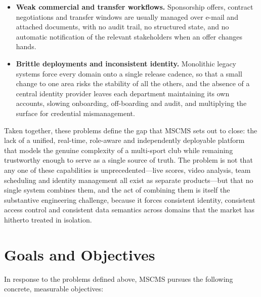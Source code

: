 \begin{itemize}
        incidence per position, or the contribution of a particular scout---is impractical,
        because the data needed to correlate one domain with another never sits in the same
        place.
  \item \textbf{Weak commercial and transfer workflows.} Sponsorship offers, contract
        negotiations and transfer windows are usually managed over e-mail and attached
        documents, with no audit trail, no structured state, and no automatic notification
        of the relevant stakeholders when an offer changes hands.
  \item \textbf{Brittle deployments and inconsistent identity.} Monolithic legacy systems
        force every domain onto a single release cadence, so that a small change to one area
        risks the stability of all the others, and the absence of a central identity provider
        leaves each department maintaining its own accounts, slowing onboarding,
        off-boarding and audit, and multiplying the surface for credential mismanagement.
\end{itemize}

Taken together, these problems define the gap that MSCMS sets out to close: the lack of a
unified, real-time, role-aware and independently deployable platform that models the genuine
complexity of a multi-sport club while remaining trustworthy enough to serve as a single
source of truth. The problem is not that any one of these capabilities is unprecedented---live
scores, video analysis, team scheduling and identity management all exist as separate
products---but that no single system combines them, and the act of combining them is itself
the substantive engineering challenge, because it forces consistent identity, consistent
access control and consistent data semantics across domains that the market has hitherto
treated in isolation.

\section{Goals and Objectives}
\label{sec:goals}

In response to the problems defined above, MSCMS pursues the following concrete,
measurable objectives:

